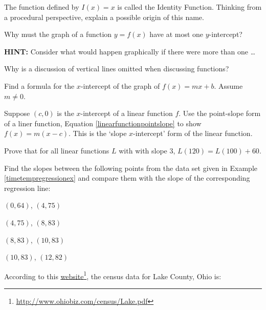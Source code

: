 \begin{exenum}

\item \label{identityexercise} The function defined by $I(x) = x$ is called the  Identity Function.   Thinking from a procedural perspective, explain a possible origin of this name.

\item  \label{onlyoneyintexercise} Why must the graph of a function $y = f(x)$ have at most one $y$-intercept?

\textbf{HINT:}  Consider what would happen graphically if there were more than one \ldots

\item  Why is a discussion of vertical lines omitted when discussing functions?

\item  \label{xinterceptoflinear} Find a formula for the $x$-intercept of the graph of $f(x) = mx + b$.  Assume $m \neq 0$.

\item  \label{xinterceptformoflinear} Suppose $(c,0)$ is the $x$-intercept of a linear function $f$.  Use the point-slope form of a liner function, Equation \ref{linearfunctionpointslope} to show $f(x) = m(x-c)$.  This is the `slope $x$-intercept' form of the linear function.

\item Prove that for all linear functions $L$ with with slope $3$, $L(120) = L(100) + 60$.

\item  Find the slopes between the following points from the data set given in Example \ref{timetempregressionex} and compare them with the slope of the corresponding regression line:
  
\begin{shortenumerate}

\item  $(0, 64)$, $(4, 75)$

\item  $(4, 75)$, $(8, 83)$

\item  $(8, 83)$, $(10, 83)$

\item  $(10, 83)$, $(12, 82)$

\end{shortenumerate}

\item According to this \href{http://www.ohiobiz.com/census/Lake.pdf}{\underline{website}}\footnote{\href{http://www.ohiobiz.com/census/Lake.pdf}{\underline{http://www.ohiobiz.com/census/Lake.pdf}}}, the census data for Lake County, Ohio is:


\end{exenum}

